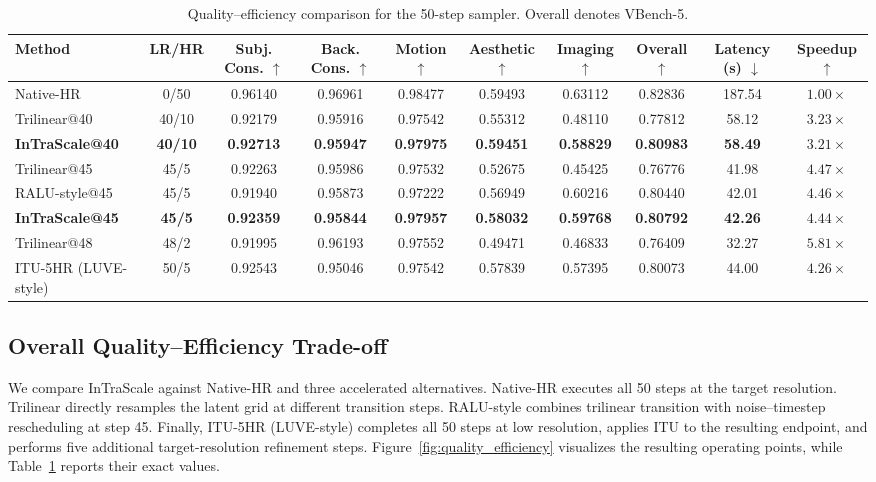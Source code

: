 \documentclass[letterpaper]{article} %
\begin{document}
\begin{table}[t]
  \centering
  \scriptsize
  \setlength{\tabcolsep}{2.4pt}
  \renewcommand{\arraystretch}{1.0}
  \begin{tabular}{@{}lccccccccc@{}}
    \toprule
    Method & LR/HR & Subj. Cons. \(\uparrow\) & Back. Cons. \(\uparrow\) &
    Motion \(\uparrow\) & Aesthetic \(\uparrow\) & Imaging \(\uparrow\) &
    Overall \(\uparrow\) & Latency (s) \(\downarrow\) & Speedup \(\uparrow\) \\
    \midrule
    Native-HR & 0/50 & 0.96140 & 0.96961 & 0.98477 & 0.59493 &
    0.63112 & 0.82836 & 187.54 & \(1.00\times\) \\
    Trilinear@40 & 40/10 & 0.92179 & 0.95916 & 0.97542 & 0.55312 &
    0.48110 & 0.77812 & 58.12 & \(3.23\times\) \\
    \textbf{InTraScale@40} & \textbf{40/10} & \textbf{0.92713} &
    \textbf{0.95947} & \textbf{0.97975} & \textbf{0.59451} &
    \textbf{0.58829} & \textbf{0.80983} & \textbf{58.49} &
    \(\mathbf{3.21\times}\) \\
    Trilinear@45 & 45/5 & 0.92263 & 0.95986 & 0.97532 & 0.52675 &
    0.45425 & 0.76776 & 41.98 & \(4.47\times\) \\
    RALU-style@45 & 45/5 & 0.91940 & 0.95873 & 0.97222 & 0.56949 &
    0.60216 & 0.80440 & 42.01 & \(4.46\times\) \\
    \textbf{InTraScale@45} & \textbf{45/5} & \textbf{0.92359} &
    \textbf{0.95844} & \textbf{0.97957} & \textbf{0.58032} &
    \textbf{0.59768} & \textbf{0.80792} & \textbf{42.26} &
    \(\mathbf{4.44\times}\) \\
    Trilinear@48 & 48/2 & 0.91995 & 0.96193 & 0.97552 & 0.49471 &
    0.46833 & 0.76409 & 32.27 & \(5.81\times\) \\
    ITU-5HR (LUVE-style) & 50/5 & 0.92543 & 0.95046 & 0.97542 &
    0.57839 & 0.57395 & 0.80073 & 44.00 & \(4.26\times\) \\
    \bottomrule
  \end{tabular}
  \caption{Quality--efficiency comparison for the 50-step sampler. Overall denotes VBench-5.}
  \label{tab:wan50_quality_efficiency}
\end{table}

\subsection{Overall Quality--Efficiency Trade-off}
\label{sec:quality_efficiency}

We compare InTraScale against Native-HR and three accelerated alternatives.
Native-HR executes all 50 steps at the target resolution. Trilinear
directly resamples the latent grid at different transition steps. RALU-style
combines trilinear transition with noise--timestep rescheduling at step
45. Finally, ITU-5HR (LUVE-style) completes all 50 steps at low
resolution, applies ITU to the resulting endpoint, and performs five
additional target-resolution refinement steps.
Figure~\ref{fig:quality_efficiency} visualizes the resulting operating points,
while Table~\ref{tab:wan50_quality_efficiency} reports their exact values.
\end{document}
